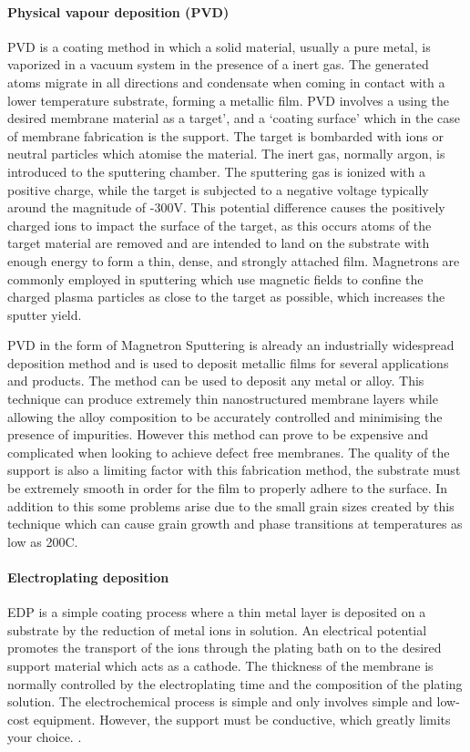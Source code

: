 \paragraph*{Physical vapour deposition (PVD)}

PVD is a coating method in which a solid material, usually a pure metal, is vaporized in a vacuum system in the presence of a inert gas. The generated atoms migrate in all directions and condensate when coming in contact with a lower temperature substrate,  forming a metallic film. PVD involves a using the desired membrane material as a target’, and a ‘coating surface’ which in the case of membrane fabrication is the support. \cite{Peters2015a} The target is bombarded with ions or neutral particles which atomise the material. The inert gas, normally argon, is introduced to the sputtering chamber. The sputtering gas is ionized with a positive charge, while the target is subjected to a negative voltage typically around the magnitude of -300V. This potential difference causes the positively charged ions to impact the surface of the target, as this occurs atoms of the target material are removed and are intended to land on the substrate with enough energy to form a thin, dense, and strongly attached film. Magnetrons are commonly employed in sputtering which use magnetic fields to confine the charged plasma particles as close to the target as possible, which increases the sputter yield. 

PVD in the form of Magnetron Sputtering is already an industrially widespread deposition method and is used to deposit metallic films for several applications and products. \cite{Peters2015a} The method can be used to deposit any metal or alloy. This technique can produce extremely thin nanostructured membrane layers while allowing the alloy composition to be accurately controlled and minimising the presence of impurities. \cite{Xomeritakis1997,McCool1999}  However this method can prove to be expensive and complicated when looking to achieve defect free membranes. \cite{Keurentjes2004} The quality of the support is also a limiting factor with this fabrication method, the substrate must be extremely smooth in order for the film to properly adhere to the surface.  In addition to this some problems arise due to the small grain sizes created by this technique which can cause grain growth and phase transitions at temperatures as low as 200\textdegree C. \cite{Bryden1995}

\paragraph*{Electroplating deposition}
EDP is a simple coating process where a thin metal layer is deposited on a substrate by the reduction of metal ions in solution. An electrical potential promotes the transport of the ions through the plating bath on to the desired support material which acts as a cathode. The thickness of the membrane is normally controlled by the electroplating time and the composition of the plating solution. The electrochemical process is simple and only involves simple and low-cost equipment. However, the support must be conductive, which greatly limits your choice. \cite{Yun2011a, NathanW.Ockwig2007a}.

